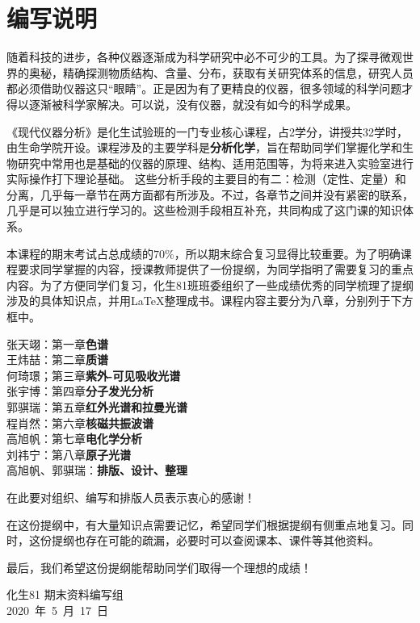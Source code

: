 \chapter*{编写说明}

随着科技的进步，各种仪器逐渐成为科学研究中必不可少的工具。为了探寻微观世界的奥秘，精确探测物质结构、含量、分布，获取有关研究体系的信息，研究人员都必须借助仪器这只“眼睛”。正是因为有了更精良的仪器，很多领域的科学问题才得以逐渐被科学家解决。可以说，没有仪器，就没有如今的科学成果。

《现代仪器分析》是化生试验班的一门专业核心课程，占2学分，讲授共32学时，由生命学院开设。课程涉及的主要学科是\textbf{分析化学}，旨在帮助同学们掌握化学和生物研究中常用也是基础的仪器的原理、结构、适用范围等，为将来进入实验室进行实际操作打下理论基础。
这些分析手段的主要目的有二：检测（定性、定量）和分离，几乎每一章节在两方面都有所涉及。不过，各章节之间并没有紧密的联系，几乎是可以独立进行学习的。这些检测手段相互补充，共同构成了这门课的知识体系。

本课程的期末考试占总成绩的$70\%$，所以期末综合复习显得比较重要。为了明确课程要求同学掌握的内容，授课教师提供了一份提纲，为同学指明了需要复习的重点内容。为了方便同学们复习，化生81班班委组织了一些成绩优秀的同学梳理了提纲涉及的具体知识点，并用\LaTeX 整理成书。课程内容主要分为八章，分别列于下方框中。
\begin{tcolorbox}[title={\bfseries 编写组成员}]
	 张天翊：第一章\hspace{1em}\textbf{色谱}\\
	 王炜喆：第二章\hspace{1em}\textbf{质谱}\\
	 何琦璟；第三章\hspace{1em}\textbf{紫外-可见吸收光谱}\\
	 张宇博：第四章\hspace{1em}\textbf{分子发光分析}\\
	 郭骐瑞：第五章\hspace{1em}\textbf{红外光谱和拉曼光谱}\\
	 程肖然：第六章\hspace{1em}\textbf{核磁共振波谱}\\
	 高旭帆：第七章\hspace{1em}\textbf{电化学分析}\\
	 刘祎宁：第八章\hspace{1em}\textbf{原子光谱}\\
	 高旭帆、郭骐瑞：\textbf{排版、设计、整理}
\end{tcolorbox}
在此要对组织、编写和排版人员表示衷心的感谢！

在这份提纲中，有大量知识点需要记忆，希望同学们根据提纲有侧重点地复习。同时，这份提纲也存在可能的疏漏，必要时可以查阅课本、课件等其他资料。

最后，我们希望这份提纲能帮助同学们取得一个理想的成绩！

\vskip 1.5cm

\begin{flushright}
	化生81 期末资料编写组\\
	2020\ 年\ 5\ 月\ 17\ 日
\end{flushright}
